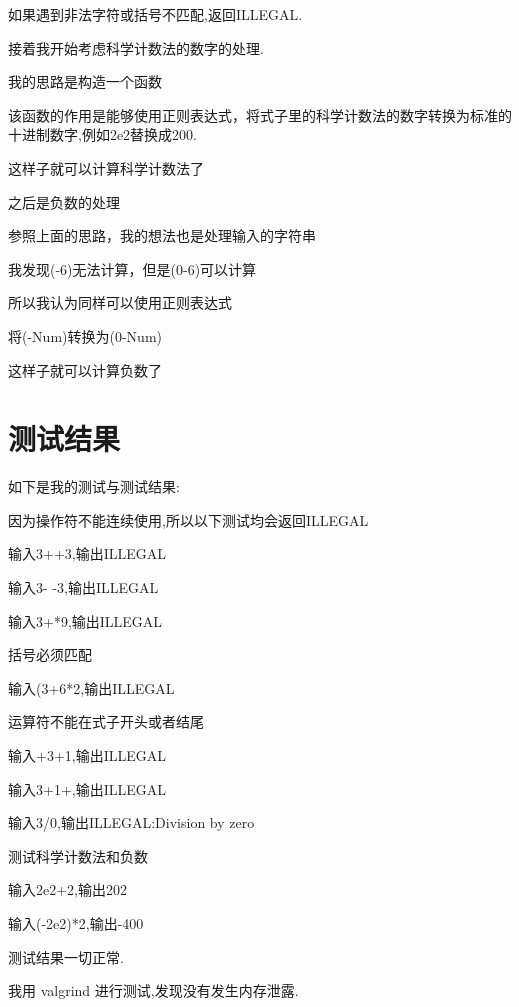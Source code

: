 \documentclass[UTF8]{ctexart}
\begin{document}
如果遇到非法字符或括号不匹配,返回ILLEGAL.



接着我开始考虑科学计数法的数字的处理.


我的思路是构造一个函数

该函数的作用是能够使用正则表达式，将式子里的科学计数法的数字转换为标准的十进制数字,例如2e2替换成200.

这样子就可以计算科学计数法了

之后是负数的处理

参照上面的思路，我的想法也是处理输入的字符串

我发现(-6)无法计算，但是(0-6)可以计算

所以我认为同样可以使用正则表达式

将(-Num)转换为(0-Num)

这样子就可以计算负数了



\section{测试结果}
如下是我的测试与测试结果:

因为操作符不能连续使用,所以以下测试均会返回ILLEGAL

输入3++3,输出ILLEGAL

输入3- -3,输出ILLEGAL

输入3+*9,输出ILLEGAL


括号必须匹配

输入(3+6*2,输出ILLEGAL


运算符不能在式子开头或者结尾

输入+3+1,输出ILLEGAL

输入3+1+,输出ILLEGAL



输入3/0,输出ILLEGAL:Division by zero



测试科学计数法和负数

输入2e2+2,输出202

输入(-2e2)*2,输出-400



测试结果一切正常.

我用 valgrind 进行测试,发现没有发生内存泄露.
\end{document}
